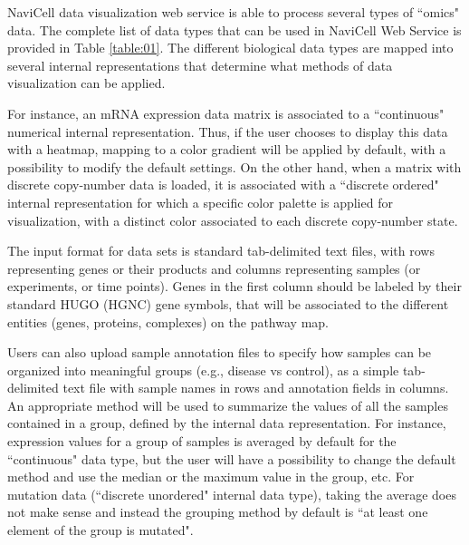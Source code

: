\documentclass[a4,center,fleqn]{NAR}
\begin{document}
NaviCell data visualization web service is able to process
several types of ``omics" data. The complete list of data types that can be used in NaviCell Web Service
is provided in Table \ref{table:01}. The different biological data
types are mapped into several internal representations that determine what methods
of data visualization can be applied.

For instance, an mRNA expression data matrix is associated to a
``continuous" numerical internal representation. Thus, if the user chooses to display
this data with a heatmap, mapping to a color gradient will be applied by default, with a possibility
to modify the default settings. On the other hand, when a
matrix with discrete copy-number data is loaded, it is associated with a
``discrete ordered" internal representation for which
a specific color palette is applied for visualization,
with a distinct color associated to each discrete copy-number state.

The input format for data sets is standard tab-delimited text files, with rows
representing genes or their products and columns representing samples (or experiments, or time
points). Genes in the first column should be labeled by their standard HUGO (HGNC)
gene symbols, that will be associated to the different entities (genes,
proteins, complexes) on the pathway map.

Users can also upload sample annotation files to specify how samples can be organized into meaningful groups
(e.g., disease vs control), as a simple tab-delimited text file with sample names in
rows and annotation fields in columns. An appropriate method will be used
to summarize the values of all the samples contained in a group, defined by the
internal data representation. For instance, expression values for a group of samples
is averaged by default for the ``continuous" data type, but the user will have
a possibility to change the default method and use the median or
the maximum value in the group, etc. For mutation data (``discrete unordered" internal data type),
taking the average does not make sense and instead the grouping method by default is
``at least one element of the group is mutated".
\end{document}
